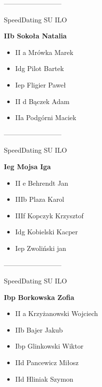 \documentclass[a4paper,10pt]{article}
\begin{document}
\begin{multicols}{3}
\begin{minipage}[l]{\textwidth}
\begin{itemize}
    \end{itemize}



\end{minipage}



\begin{minipage}[l]{\textwidth}
--------------------------

  \footnotesize{SpeedDating SU ILO}

  \bfseries{IIb Sokoła Natalia}

  \begin{itemize}
    \item II a Mrówka Marek
    \item Idg Pilot Bartek
    \item Iep Fligier Paweł
    \item II d Bączek Adam
    \item IIa Podgórni Maciek

    \end{itemize}



\end{minipage}



\begin{minipage}[l]{\textwidth}
--------------------------

  \footnotesize{SpeedDating SU ILO}

  \bfseries{Ieg Mojsa Iga}

  \begin{itemize}
    \item II e Behrendt Jan
    \item IIIb Plaza Karol
    \item IIIf Kopczyk Krzysztof
    \item Idg Kobielski Kacper
    \item Iep Zwoliński jan

    \end{itemize}



\end{minipage}



\begin{minipage}[l]{\textwidth}
--------------------------

  \footnotesize{SpeedDating SU ILO}

  \bfseries{Ibp Borkowska Zofia}

  \begin{itemize}
    \item II a Krzyżanowski Wojciech
    \item IIb Bajer Jakub
    \item Ibp Glinkowski Wiktor
    \item IId Pancewicz Miłosz
    \item IId Hliniak Szymon


\end{itemize}
\end{minipage}
\end{multicols}
\end{document}
